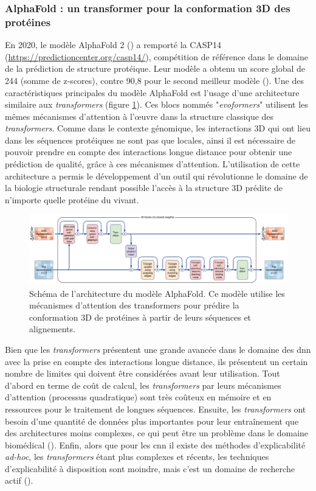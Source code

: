 \subsubsection{AlphaFold : un transformer pour la conformation 3D des protéines}
En 2020, le modèle AlphaFold 2 (\cite{jumper_highly_2021}) a remporté la CASP14 (\href{https://predictioncenter.org/casp14/}{https://predictioncenter.org/casp14/}), compétition de référence dans le domaine de la prédiction de structure protéique. Leur modèle a obtenu un score global de 244 (somme de z-scores), contre 90,8 pour le second meilleur modèle (\cite{jumper_applying_2021}). Une des caractéristiques principales du modèle AlphaFold est l'usage d'une architecture similaire aux \textit{transformers} (figure \ref{fig:alphafold}). Ces blocs nommés "\textit{evoformers}" utilisent les mêmes mécanismes d'attention à l'œuvre dans la structure classique des \textit{transformers}. Comme dans le contexte génomique, les interactions 3D qui ont lieu dans les séquences protéiques ne sont pas que locales, ainsi il est nécessaire de pouvoir prendre en compte des interactions longue distance pour obtenir une prédiction de qualité, grâce à ces mécanismes d'attention. L'utilisation de cette architecture a permis le développement d'un outil qui révolutionne le domaine de la biologie structurale rendant possible l'accès à la structure 3D prédite de n'importe quelle protéine du vivant.
\begin{figure}[!ht]
 \centering
 \includegraphics[width=1\textwidth]{figures/alphafold.png}
 \caption[Schéma de l'architecture du modèle AlphaFold]{Schéma de l'architecture du modèle AlphaFold. Ce modèle utilise les mécanismes d'attention des transformers pour prédire la conformation 3D de protéines à partir de leurs séquences et alignements.}
 \label{fig:alphafold}
\end{figure}


Bien que les \textit{transformers} présentent une grande avancée dans le domaine des \gls{dnn} avec la prise en compte des interactions longue distance, ils présentent un certain nombre de limites qui doivent être considérées avant leur utilisation. Tout d'abord en terme de coût de calcul, les \textit{transformers} par leurs mécanismes d'attention (processus quadratique) sont très coûteux en mémoire et en ressources pour le traitement de longues séquences. Ensuite, les \textit{transformers} ont besoin d'une quantité de données plus importantes pour leur entraînement que des architectures moins complexes, ce qui peut être un problème dans le domaine biomédical (\cite{willemink_toward_2022}). Enfin, alors que pour les \gls{cnn} il existe des méthodes d'explicabilité \textit{ad-hoc}, les \textit{transformers} étant plus complexes et récents, les techniques d'explicabilité à disposition sont moindre, mais c'est un domaine de recherche actif (\cite{kim_can_2022, saha_explainability_2022}). 


